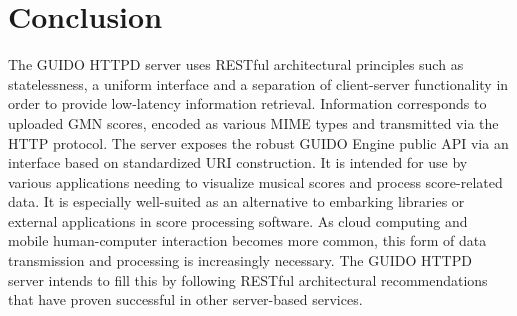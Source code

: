 \documentclass{article}
\begin{document}
\section{Conclusion}
The GUIDO HTTPD server uses RESTful architectural principles such as statelessness, a uniform interface and a separation of client-server functionality in order to provide low-latency information retrieval.  Information corresponds to uploaded GMN scores, encoded as various MIME types and transmitted via the HTTP protocol.  The server exposes the robust GUIDO Engine public API via an interface based on standardized URI construction.  It is intended for use by various applications needing to visualize musical scores and process score-related data.  It is especially well-suited as an alternative to embarking libraries or external applications in score processing software.  As cloud computing and mobile human-computer interaction becomes more common, this form of data transmission and processing is increasingly necessary.  The GUIDO HTTPD server intends to fill this by following RESTful architectural recommendations that have proven successful in other server-based services.\par

\end{document}
